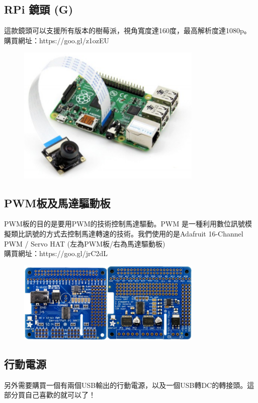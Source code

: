 \documentclass{article}
\begin{document}
\subsection{RPi 鏡頭 (G)}
這款鏡頭可以支援所有版本的樹莓派，視角寬度達160度，最高解析度達1080p。
\\購買網址：https://goo.gl/z1ozEU
\\
\begin{figure}[htp]
    \begin{center}
        \includegraphics[width=250pt]{pic/1_1_4.png}
    \end{center}
\end{figure}

\subsection{PWM板及馬達驅動板}
PWM板的目的是要用PWM的技術控制馬達驅動。PWM 是一種利用數位訊號模擬類比訊號的方式去控制馬達轉速的技術。我們使用的是Adafruit 16-Channel
PWM / Servo HAT (左為PWM板/右為馬達驅動板)
\\購買網址：https://goo.gl/jrC2dL
\\
\begin{figure}[htp]
    \begin{center}
        \includegraphics[width=250pt]{pic/1_1_5.png}
    \end{center}
\end{figure}

\subsection{行動電源}
另外需要購買一個有兩個USB輸出的行動電源，以及一個USB轉DC的轉接頭。這部分買自己喜歡的就可以了！
\end{document}
